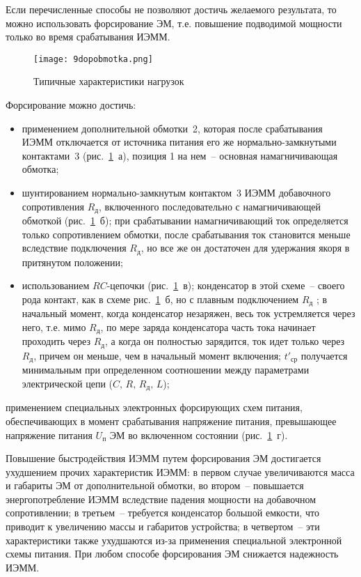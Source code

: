 Если перечисленные способы не позволяют достичь желаемого результата, то можно использовать форсирование ЭМ, т.е. повышение подводимой мощности только во время срабатывания ИЭММ.

\begin{figure}[h!]
	\caption{ Типичные характеристики нагрузок }
	\texttt{[image: 9dopobmotka.png]}
	\label{pic:9dopobmotka}
\end{figure}

Форсирование можно достичь:
\begin{itemize}
\item применением дополнительной обмотки~2, которая после срабатывания ИЭММ отключается от источника питания его же нормально-замкнутыми контактами~3 (рис.~\ref{pic:9dopobmotka}~а), позиция 1 на нем~-- основная намагничивающая обмотка;
\item шунтированием нормально-замкнутым контактом~3 ИЭММ добавочного сопротивления $ R_\text{д} $, включенного последовательно с намагничивающей обмоткой (рис.~\ref{pic:9dopobmotka}~б); при срабатывании намагничивающий ток определяется только сопротивлением обмотки, после срабатывания ток становится меньше вследствие подключения  $ R_\text{д} $, но все же он достаточен для удержания якоря в притянутом положении;
\item использованием $ RC $-цепочки (рис.~\ref{pic:9dopobmotka}~в); конденсатор в этой схеме~-- своего рода контакт, как в схеме рис.~\ref{pic:9dopobmotka}~б, но с плавным подключением $ R_\text{д} $ ; в начальный момент, когда конденсатор незаряжен, весь ток устремляется через него, т.е. мимо $ R_\text{д} $, по мере заряда конденсатора часть тока начинает проходить через $ R_\text{д} $, а когда он полностью зарядится, ток идет только через $ R_\text{д} $, причем он меньше, чем в начальный момент включения; $ t'_\text{ср} $ получается минимальным при определенном соотношении между параметрами электрической цепи ($ C,\, R,\, R_\text{д},\, L $);
\end{itemize} 

применением специальных электронных форсирующих схем питания, обеспечивающих в момент срабатывания напряжение питания, превышающее напряжение питания $ U_\text{п} $ ЭМ во включенном состоянии (рис.~\ref{pic:9dopobmotka}~г).

Повышение быстродействия ИЭММ путем форсирования ЭМ достигается ухудшением прочих характеристик ИЭММ: в первом случае увеличиваются масса и габариты ЭМ от дополнительной обмотки, во втором~-- повышается энергопотребление ИЭММ вследствие падения мощности на добавочном сопротивлении; в третьем~-- требуется конденсатор большой емкости, что приводит к увеличению массы и габаритов устройства; в четвертом~-- эти характеристики также ухудшаются из-за применения специальной электронной схемы питания. При любом способе форсирования ЭМ снижается надежность ИЭММ. 

